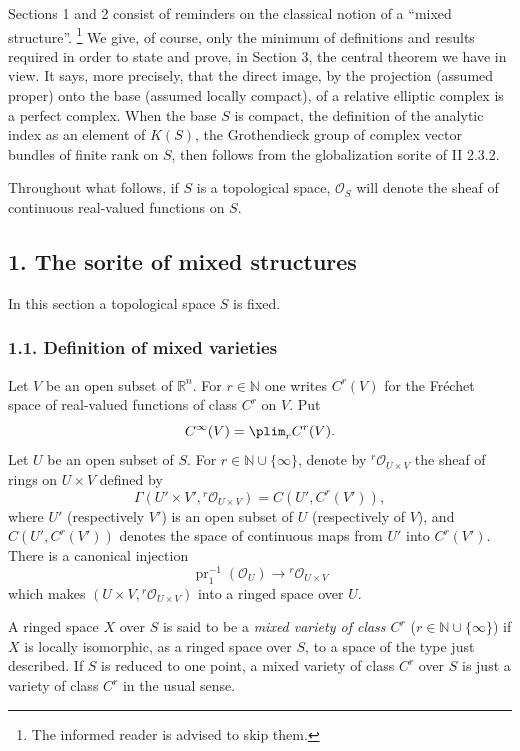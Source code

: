 \documentclass[11pt]{article}
\begin{document}
Sections 1 and 2 consist of reminders on the classical notion of a ``mixed structure''.
\footnote{The informed reader is advised to skip them.}
We give, of course, only the minimum of definitions and results required in order to state and prove, in Section 3, the central theorem we have in view. It says, more precisely, that the direct image, by the projection (assumed proper) onto the base (assumed locally compact), of a relative elliptic complex is a perfect complex. When the base $S$ is compact, the definition of the analytic index as an element of $K(S)$, the Grothendieck group of complex vector bundles of finite rank on $S$, then follows from the globalization sorite of II 2.3.2.

Throughout what follows, if $S$ is a topological space, $\mathcal O_S$ will denote the sheaf of continuous real-valued functions on $S$.

\subsection*{1. The sorite of mixed structures}

In this section a topological space $S$ is fixed.

\subsubsection*{1.1. Definition of mixed varieties}

Let $V$ be an open subset of $\mathbb R^n$. For $r\in\mathbb N$ one writes $C^r(V)$ for the Fréchet space of real-valued functions of class $C^r$ on $V$. Put
\[
 C^\infty(V)=\plim_r C^r(V).
\]
Let $U$ be an open subset of $S$. For $r\in\mathbb N\cup\{\infty\}$, denote by ${}^r\mathcal O_{U\times V}$ the sheaf of rings on $U\times V$ defined by
\[
 \Gamma(U'\times V',{}^r\mathcal O_{U\times V})
 =C(U',C^r(V')),
\]
where $U'$ (respectively $V'$) is an open subset of $U$ (respectively of $V$), and $C(U',C^r(V'))$ denotes the space of continuous maps from $U'$ into $C^r(V')$. There is a canonical injection
\[
 \operatorname{pr}_1^{-1}(\mathcal O_U)\longrightarrow {}^r\mathcal O_{U\times V}
\]
which makes $(U\times V,{}^r\mathcal O_{U\times V})$ into a ringed space over $U$.

A ringed space $X$ over $S$ is said to be a \emph{mixed variety of class $C^r$} ($r\in\mathbb N\cup\{\infty\}$) if $X$ is locally isomorphic, as a ringed space over $S$, to a space of the type just described. If $S$ is reduced to one point, a mixed variety of class $C^r$ over $S$ is just a variety of class $C^r$ in the usual sense.
\end{document}
